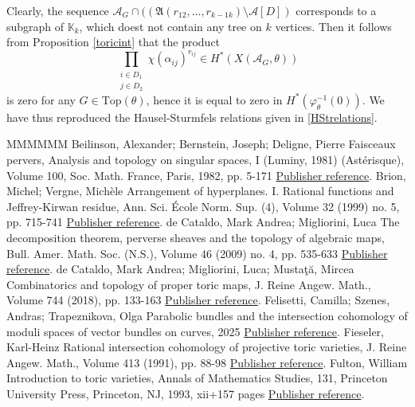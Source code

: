 \documentclass[11pt]{article}
\theoremstyle{definition}
\numberwithin{equation}{section}
\newcommand{\A}{\mathfrak{A}}
\begin{document}
Clearly,  the sequence $\mathcal{A}_G\cap ((\A(r_{12}, \ldots ,r_{k-1 
k})\setminus\mathcal{A}[{D}])$
corresponds to a subgraph of $\mathbb{K}_k$, which doest not contain any tree 
on $k$ vertices. Then it follows from Proposition \ref{toricint} that the 
product $$\prod_{\substack{i\in D_1 \\ j\in D_2}}\chi(\alpha_{ij})^{r_{ij}}\in 
H^*(X(\mathcal{A}_G, \theta))$$ is zero for any $G\in\mathrm{Top}(\theta)$, hence it is equal to zero in $ H^*(\varphi^{-1}_\theta(0))$.  We have thus 
reproduced the Hausel-Sturmfels relations given in \eqref{HStrelations}.
\begin{thebibliography}{MMMMMM}
 Beilinson, Alexander; Bernstein, Joseph; Deligne, Pierre Faisceaux pervers, Analysis and topology on singular spaces, I (Luminy, 1981) (Astérisque), Volume 100, Soc. Math. France, Paris, 1982, pp. 5-171 \href{https://alco.centre-mersenne.org/articles/10.5802/alco.417/#BBD}{Publisher reference}.
 Brion, Michel; Vergne, Michèle Arrangement of hyperplanes. I. Rational functions and Jeffrey-Kirwan residue, Ann. Sci. École Norm. Sup. (4), Volume 32 (1999) no. 5, pp. 715-741 \href{https://alco.centre-mersenne.org/articles/10.5802/alco.417/#BV}{Publisher reference}.
 de Cataldo, Mark Andrea; Migliorini, Luca The decomposition theorem, perverse sheaves and the topology of algebraic maps, Bull. Amer. Math. Soc. (N.S.), Volume 46 (2009) no. 4, pp. 535-633 \href{https://alco.centre-mersenne.org/articles/10.5802/alco.417/#dCMdec}{Publisher reference}.
 de Cataldo, Mark Andrea; Migliorini, Luca; Mustaţă, Mircea Combinatorics and topology of proper toric maps, J. Reine Angew. Math., Volume 744 (2018), pp. 133-163 \href{https://alco.centre-mersenne.org/articles/10.5802/alco.417/#dCMMtor}{Publisher reference}.
 Felisetti, Camilla; Szenes, Andras; Trapeznikova, Olga Parabolic bundles and the intersection cohomology of moduli spaces of vector bundles on curves, 2025 \href{https://alco.centre-mersenne.org/articles/10.5802/alco.417/#cfotasz}{Publisher reference}.
 Fieseler, Karl-Heinz Rational intersection cohomology of projective toric varieties, J. Reine Angew. Math., Volume 413 (1991), pp. 88-98 \href{https://alco.centre-mersenne.org/articles/10.5802/alco.417/#Fiesler}{Publisher reference}.
 Fulton, William Introduction to toric varieties, Annals of Mathematics Studies, 131, Princeton University Press, Princeton, NJ, 1993, xii+157 pages \href{https://alco.centre-mersenne.org/articles/10.5802/alco.417/#Fulton}{Publisher reference}.

\end{thebibliography}
\end{document}
